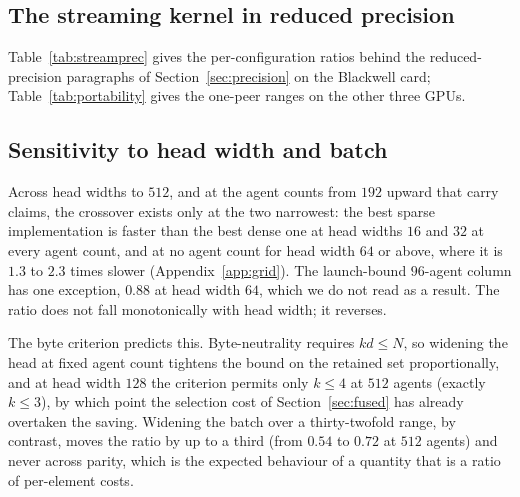 \subsection{The streaming kernel in reduced precision}
\label{app:streamprec}

Table~\ref{tab:streamprec} gives the per-configuration ratios behind the
reduced-precision paragraphs of Section~\ref{sec:precision} on the Blackwell
card; Table~\ref{tab:portability} gives the one-peer ranges on the other three
GPUs.

\begin{table}[t]
\centering\small
\caption{The streaming kernel of Table~\ref{tab:streaming} in reduced
precision, searched separately in each format, against the best dense
implementation of the same format and interleaved sweep (ratios of minima under
CUDA-graph replay); the resident kernel at one retained peer is re-timed in the
same sweep. A dash marks a configuration in which TF32 rounding changed the
retained set in more than $0.1\%$ of query rows; bf16 changed none. For the
streaming kernel the median of the per-repetition paired ratios is within
$9.6\%$ of the ratio of minima, with a $95\%$ bootstrap interval within
$\pm5.0\%$; in bf16 at one retained peer it is $0.90$ to $1.04$.}
\label{tab:streamprec}

\end{table}

\subsection{Sensitivity to head width and batch}
\label{sec:sensitivity}


Across head widths to $512$, and at the agent counts from $192$ upward that
carry claims, the crossover exists only at the two narrowest: the best sparse
implementation is faster than the best dense one at head widths $16$ and $32$
at every agent count, and at no agent count for head width $64$ or above, where
it is $1.3$ to $2.3$ times slower (Appendix~\ref{app:grid}). The launch-bound
$96$-agent column has one exception, $0.88$ at head width $64$, which we do not
read as a result. The ratio does not fall monotonically with head
width; it reverses.

The byte criterion predicts this. Byte-neutrality requires
$kd \le N$, so widening the head at fixed agent count tightens the bound on the
retained set proportionally, and at head width $128$ the criterion permits only $k \le 4$ at $512$ agents (exactly $k \le 3$), by which point the selection cost of
Section~\ref{sec:fused} has already overtaken the saving. Widening the batch
over a
thirty-twofold range, by contrast, moves the ratio by up to a third (from
$0.54$ to $0.72$ at $512$ agents) and never across parity, which is the expected behaviour of a quantity that is a
ratio of per-element costs.



